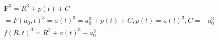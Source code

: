 \begin{problem}
\begin{enumerate}
    
    \begin{align}
    \mathbf{F}^3=R^3+p(t)+C \\
    =F(a_{0}, t)^3=a(t)^3=a_{0}^3+p(t)+C, p(t)=a(t)^3, C = -a_{0}^3 \\
    f(R,t)^3=R^3+a(t)^3-a_{0}^3 \\
    \end{align}
    \end{enumerate}
    
\end{problem}
\pagebreak